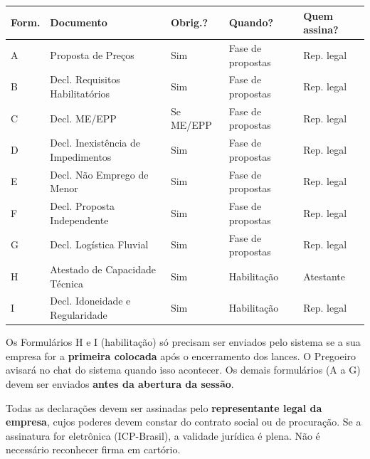 \documentclass[12pt,a4paper]{article}
\begin{document}
\begin{table}[H]\centering\small{}
\begin{tabular}{C{1.8cm} L{5.0cm} C{1.5cm} C{1.5cm} C{3.2cm}}
  \color{white}\textbf{Form.} &
  \color{white}\textbf{Documento} &
  \color{white}\textbf{Obrig.?} &
  \color{white}\textbf{Quando?} &
  \color{white}\textbf{Quem assina?} \\
  \toprule
  A & Proposta de Preços                    & Sim & Fase de propostas & Rep. legal \\
  B & Decl. Requisitos Habilitatórios       & Sim & Fase de propostas & Rep. legal \\
  C & Decl. ME/EPP                          & Se ME/EPP & Fase de propostas & Rep. legal \\
  D & Decl. Inexistência de Impedimentos    & Sim & Fase de propostas & Rep. legal \\
  E & Decl. Não Emprego de Menor            & Sim & Fase de propostas & Rep. legal \\
  F & Decl. Proposta Independente           & Sim & Fase de propostas & Rep. legal \\
  G & Decl. Logística Fluvial               & Sim & Fase de propostas & Rep. legal \\
  H & Atestado de Capacidade Técnica        & Sim & Habilitação & Atestante \\
  I & Decl. Idoneidade e Regularidade       & Sim & Habilitação & Rep. legal \\
  \bottomrule
\end{tabular}
\end{table}

\begin{dicabox}
\small
Os Formulários H e I (habilitação) só precisam ser enviados pelo sistema se a
sua empresa for a \textbf{primeira colocada} após o encerramento dos lances.
O Pregoeiro avisará no chat do sistema quando isso acontecer. Os demais
formulários (A a G) devem ser enviados \textbf{antes da abertura da sessão}.
\end{dicabox}

\begin{atencaobox}
\small
Todas as declarações devem ser assinadas pelo \textbf{representante legal da empresa},
cujos poderes devem constar do contrato social ou de procuração. Se a assinatura
for eletrônica (ICP-Brasil), a validade jurídica é plena. Não é necessário reconhecer
firma em cartório.
\end{atencaobox}
\end{document}
